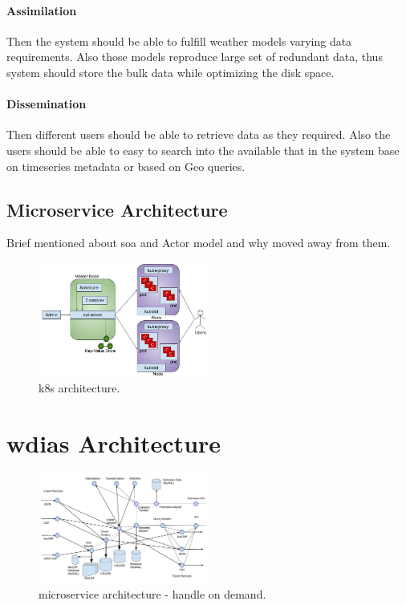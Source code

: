 \documentclass[conference]{IEEEtran}
\begin{document}
\paragraph{Assimilation} Then the system should be able to fulfill weather models varying data requirements. Also those models reproduce large set of redundant data, thus system should store the bulk data while optimizing the disk space.
\paragraph{Dissemination} Then different users should be able to retrieve data as they required. Also the users should be able to easy to search into the available that in the system base on timeseries metadata or based on Geo queries.

\subsection{Microservice Architecture}
Brief mentioned about soa and Actor model and why moved away from them.
\begin{figure}[htbp]
\centerline{\includegraphics[width=0.5\textwidth]{method/microservice/k8s_architecture_v3.jpg}}
\caption{\acrfull{k8s} architecture.}
\label{fi:k8s_architecture}
\end{figure}

\section{\acrfull{wdias} Architecture}
\begin{figure}[htbp]
\centerline{\includegraphics[width=0.5\textwidth]{method/microservice/microservice_architecture-handle_on_demand-v3.jpg}}
\caption{microservice architecture - handle on demand.}
\label{fi:microservice_architecture_on_demand}
\end{figure}
\end{document}
